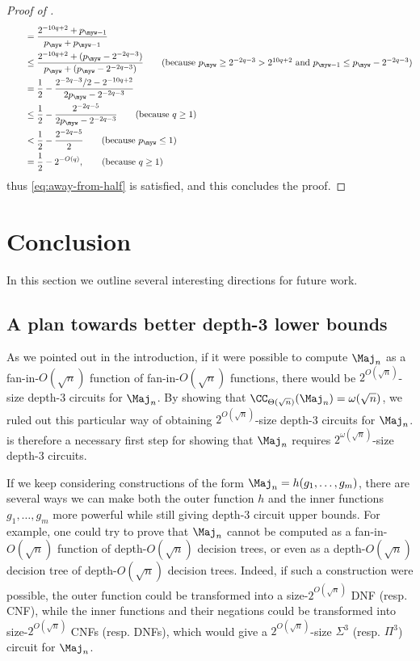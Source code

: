 \begin{proof}[Proof of ]
\begin{align*}
&\qquad= \frac{2^{-10q+2} + p_{\myw-1}}{p_{\myw}+p_{\myw-1}}\\
&\qquad\leq \frac{2^{-10q+2} + (p_\myw - 2^{-2q-3})}{p_\myw + (p_\myw-2^{-2q-3})}\tag{because $p_\myw \geq 2^{-2q-3} > 2^{10q+2}$ and $p_{\myw-1} \leq p_{\myw}-2^{-2q-3}$}\\
&\qquad= \frac{1}{2} - \frac{2^{-2q-3}/2 - 2^{-10q+2}}{2p_\myw-2^{-2q-3}}\\
&\qquad\leq \frac{1}{2} - \frac{2^{-2q-5}}{2p_\myw-2^{-2q-3}}\tag{because $q \geq 1$}\\
&\qquad< \frac{1}{2} - \frac{2^{-2q-5}}{2}\tag{because $p_\myw \leq 1$}\\
&\qquad= \frac{1}{2} - 2^{-O(q)},\tag{because $q \geq 1$}
\end{align*}
thus \eqref{eq:away-from-half} is satisfied, and this concludes the proof.
\end{proof}

\section{Conclusion}\label{sec:conclusion}
In this section we outline several
interesting directions for future work.

\subsection{A plan towards better depth-3 lower bounds}
\label{subsec:depth3-plan}
As we pointed out in the introduction, if it were possible to compute $\Maj_n$ as a fan-in-$O(\sqrt{n})$ function of fan-in-$O(\sqrt{n})$ functions, there would be $2^{O(\sqrt{n})}$-size depth-3 circuits for $\Maj_n$.
By showing that $\CC_{\Theta(\sqrt{n})}(\Maj_n) = \omega(\sqrt{n})$, we ruled out this particular way of obtaining $2^{O(\sqrt{n})}$-size depth-3 circuits for $\Maj_n$.
 is therefore a necessary first step for showing that $\Maj_n$ requires $2^{\omega(\sqrt{n})}$-size depth-3 circuits.

If we keep considering constructions of the form $\Maj_n = h(g_1, \ldots, g_m)$, there are several ways we can make both the outer function $h$ and the inner functions $g_1, \ldots, g_m$ more powerful while still giving depth-3 circuit upper bounds.
For example, one could try to prove that $\Maj_n$ cannot be computed as a fan-in-$O(\sqrt{n})$ function of depth-$O(\sqrt{n})$ decision trees,
or even as a depth-$O(\sqrt{n})$ decision tree of depth-$O(\sqrt{n})$ decision trees.
Indeed, if such a construction were possible, the outer function could be transformed into a size-$2^{O(\sqrt{n})}$ DNF (resp. CNF), while the inner functions and their negations could be transformed into size-$2^{O(\sqrt{n})}$  CNFs (resp. DNFs), which would give a $2^{O(\sqrt{n})}$-size $\Sigma^3$ (resp. $\Pi^3$) circuit for $\Maj_n$.

